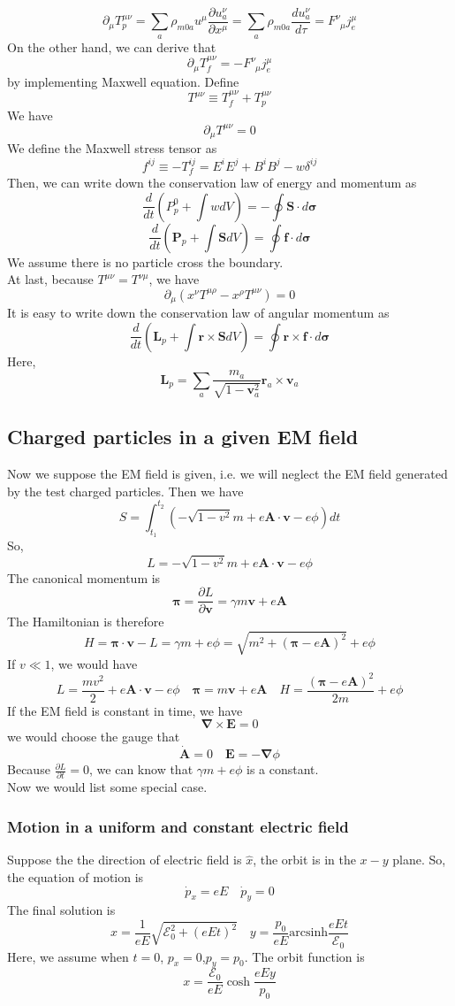 \documentclass[cyan]{elegantnote}
\begin{document}
\[\partial_{\mu} T_p^{\mu\nu} = \sum_a \rho_{m0a}u^{\mu} \frac{\partial u_a^{\nu}}{\partial x^{\mu}} = \sum_a \rho_{m0a} \frac{d u_a^{\nu}}{d \tau} = F^{\nu}_{\phantom{\nu}\mu}j_e^{\mu}\]
On the other hand, we can derive that
\[\partial_{\mu} T_f^{\mu\nu} = - F^{\nu}_{\phantom{\nu}\mu}j_e^{\mu}\]
by implementing Maxwell equation.
Define
\[T^{\mu \nu} \equiv T_f^{\mu\nu} + T_p^{\mu\nu}\]
We have
\[\partial_{\mu} T^{\mu\nu} = 0\]
We define the Maxwell stress tensor as
\[f^{ij} \equiv -T_f^{ij} = E^{i}E^{j} + B^{i}B^{j} - w\delta^{ij}\]
Then, we can write down the conservation law of energy and momentum as
\[\frac{d}{dt}\left(P_p^0 + \int w dV \right) = -\oint \bm{S}\cdot d\bm{\sigma}\]
\[\frac{d}{dt}\left(\bm{P}_p + \int \bm{S} dV \right) = \oint \bm{f}\cdot d\bm{\sigma}\]
We assume there is no particle cross the boundary.\\
At last, because $T^{\mu\nu} = T^{\nu\mu}$, we have
\[\partial_{\mu}(x^{\nu}T^{\mu\rho}-x^{\rho}T^{\mu\nu}) = 0\]
It is easy to write down the conservation law of angular momentum as
\[\frac{d}{dt}\left(\bm{L}_p + \int \bm{r} \times \bm{S} dV \right) = \oint \bm{r} \times \bm{f}\cdot d\bm{\sigma}\]
Here,
\[\bm{L}_p = \sum_a \frac{m_a}{\sqrt{1-\bm{v}_a^2}} \bm{r}_a  \times \bm{v}_a \]

\subsection{Charged particles in a given EM field}
Now we suppose the EM field is given, i.e. we will neglect the EM field generated by the test charged particles. Then we have
\[S = \int_{t_1}^{t_2} (-\sqrt{1-v^2}m + e\bm{A}\cdot\bm{v}-e\phi)dt\]
So,
\[L = -\sqrt{1-v^2}m + e\bm{A}\cdot\bm{v}-e\phi\]
The canonical momentum is
\[\bm{\pi} = \frac{\partial L}{\partial \bm{v}} = \gamma m \bm{v} + e \bm{A}\]
The Hamiltonian is therefore
\[H = \bm{\pi} \cdot \bm{v} - L = \gamma m + e \phi = \sqrt{m^2+(\bm{\pi}-e\bm{A})^2}+e\phi\]
If $v \ll 1$, we would have
\[L = \frac{mv^2}{2} + e\bm{A}\cdot\bm{v}-e\phi \quad \bm{\pi} =  m \bm{v} + e \bm{A} \quad H = \frac{(\bm{\pi}-e\bm{A})^2}{2m}+e\phi\]
If the EM field is constant in time, we have
\[\bm{\nabla} \times \bm{E} = 0\]
we would choose the gauge that
\[\dot{\bm{A}} = 0 \quad \bm{E} = -\bm{\nabla} \phi\]
Because $\frac{\partial L}{\partial t}=0$, we can know that $\gamma m + e\phi$ is a constant.\\
Now we would list some special case.
\subsubsection{Motion in a uniform and constant electric field}
Suppose the the direction of electric field is  $\hat{x}$, the orbit is in the $x-y$ plane. So, the equation of motion is
\[\dot{p}_x = eE \quad \dot{p}_y = 0\]
The final solution is
\[x = \frac{1}{eE}\sqrt{\mathcal{E}_0^2 + (eEt)^2} \quad y = \frac{p_0}{eE} \mathrm{arcsinh} \frac{eEt}{\mathcal{E}_0}\]
Here, we assume when $t=0$, $p_x = 0$,$p_y=p_0$.
The orbit function is
\[x = \frac{\mathcal{E}_0}{eE}\cosh \frac{eEy}{p_0}\]
\end{document}
